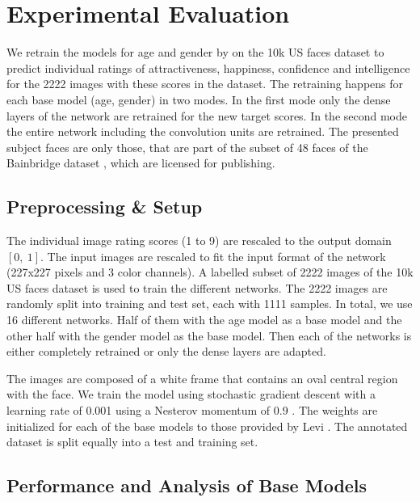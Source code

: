 \documentclass[runningheads]{llncs}
\begin{document}
\section{Experimental Evaluation}
We retrain the models for age and gender by \cite{levi2015age} on the 10k US faces dataset \cite{bainbridge2013intrinsic} to predict individual ratings of attractiveness, happiness, confidence and intelligence for the 2222 images with these scores in the dataset. The retraining happens for each base model (age, gender) in two modes. In the first mode only the dense layers of the network are retrained for the new target scores. In the second mode the entire network including the convolution units are retrained. The presented subject faces are only those, that are part of the subset of 48 faces of the Bainbridge dataset \cite{bainbridge2013intrinsic}, which are licensed for publishing.

\subsection{Preprocessing \& Setup}
The individual image rating scores (1 to 9) are rescaled to the output domain $\left[0,\ 1\right]$. The input images are rescaled to fit the input format of the network (227x227 pixels and 3 color channels). A labelled subset of 2222 images of the 10k US faces dataset is used to train the different networks. The 2222 images are randomly split into training and test set, each with 1111 samples. In total, we use 16 different networks. Half of them with the age model as a base model and the other half with the gender model as the base model. Then each of the networks is either completely retrained or only the dense layers are adapted.

The images are composed of a white frame that contains an oval central region with the face. 
We train the model using stochastic gradient descent with a learning rate of 0.001 using a Nesterov momentum of 0.9 \cite{lecun2012efficient}. The weights are initialized for each of the base models to those	 provided by Levi \cite{levi2015age}. 
The annotated dataset is split equally into a test and training set.


\subsection{Performance and Analysis of Base Models}
\end{document}
